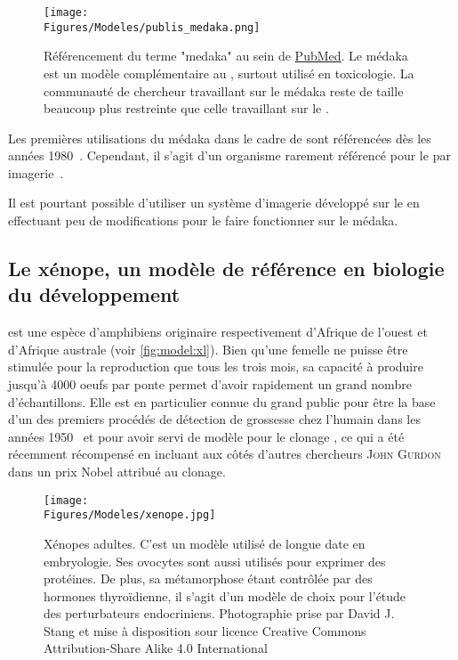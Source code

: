\documentclass[\main/main.tex]{subfiles}
\begin{document}
\begin{figure}[h!]{\textwidth} 
    \centering
       \centering \texttt{[image: \\Figures/Modeles/publis\_medaka.png]}
       \caption{
            \label{fig:model:oz:stats}Référencement du terme "medaka" au sein de \href{https://pubmed.ncbi.nlm.nih.gov/?term=medaka&sort=pubdate}{PubMed}.\newline
            Le médaka est un modèle complémentaire au \pz{}, surtout utilisé en toxicologie. La communauté de chercheur travaillant sur le médaka reste de taille beaucoup plus restreinte que celle travaillant sur le \pz{}.
            }
\end{figure}

Les premières utilisations du médaka dans le cadre de \hcs{} sont référencées dès les années 1980~\cite{cameron_1985,Hatanaka_1982}.
%
Cependant, il s'agit d'un organisme rarement référencé pour le \hcs{} par imagerie~\cite{gierten_2020,genest_2019}.

%
Il est pourtant possible d'utiliser un système d'imagerie développé sur le \pz{}
en effectuant peu de modifications pour le faire fonctionner sur le médaka.

    \subsection{Le xénope, un modèle de référence en biologie du développement}

%
\xl{} est une espèce d'amphibiens originaire respectivement d'Afrique de l'ouest et d'Afrique australe (voir \autoref{fig:model:xl}).
%
Bien qu'une femelle ne puisse être stimulée pour la reproduction que tous les trois mois,
sa capacité à produire jusqu'à 4000 oeufs par ponte permet d'avoir rapidement un grand nombre d'échantillons.
%
Elle est en particulier connue du grand public pour être la base d'un des premiers procédés de détection de grossesse chez l'humain dans les années 1950~\cite{hobson_1958,Dittebrandt_1949,polack_1949}
et pour avoir servi de modèle pour le clonage , ce qui a été récemment récompensé en incluant aux côtés d'autres chercheurs \textsc{John Gurdon}  dans un prix Nobel attribué au clonage.

\begin{figure}[h!]{\textwidth} 
    \centering
       \centering \texttt{[image: \\Figures/Modeles/xenope.jpg]}
       \caption{
            \label{fig:model:xl}
            Xénopes adultes.
            \newline
            C'est un modèle utilisé de longue date en embryologie.
            Ses ovocytes sont aussi utilisés pour exprimer des protéines.
            De plus, sa métamorphose étant contrôlée par des hormones thyroïdienne, il s'agit d'un modèle de choix pour l'étude des perturbateurs endocriniens.
            \newline
            Photographie prise par David J. Stang et mise à disposition sour licence  Creative Commons Attribution-Share Alike 4.0 International
            }
\end{figure}
\end{document}
